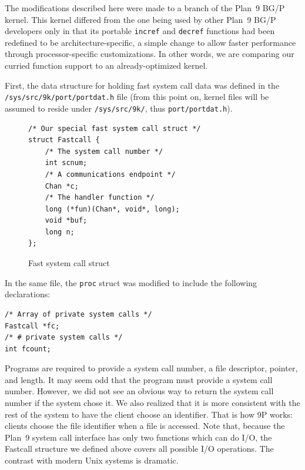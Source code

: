 \documentclass[letterpaper]{article}
\begin{document}
The modifications described here were made to a branch of the Plan~9 BG/P kernel. This kernel differed from the one being used by other Plan~9 BG/P developers only in that its portable {\tt incref} and {\tt decref} functions had been redefined to be architecture-specific, a simple change to allow faster performance through processor-specific customizations. In other words, we are comparing our curried function 
support to an already-optimized kernel. 

First, the data structure for holding fast system call data was defined in the {\tt /sys/src/9k/port/portdat.h} file (from this point on, kernel files will be assumed to reside under {\tt /sys/src/9k/}, thus {\tt port/portdat.h}). 

\begin{figure}
\begin{verbatim}
/* Our special fast system call struct */
struct Fastcall {
    /* The system call number */
    int scnum; 
    /* A communications endpoint */
    Chan *c; 
    /* The handler function */
    long (*fun)(Chan*, void*, long); 
    void *buf;
    long n;
};
\end{verbatim}
\caption{\label{scstruct}Fast system call struct}
\end{figure}

In the same file, the {\tt proc} struct was modified to include the following declarations:

\begin{verbatim}
/* Array of private system calls */
Fastcall *fc;
/* # private system calls */
int fcount; 
\end{verbatim}

Programs are required to provide a system call number, a file descriptor, pointer, and length. It may seem odd that
the program must provide a system call number. However, we did not see an obvious way to return the
system call number if the system
chose it. We also realized that it is more consistent with the rest of the system to have the client choose an identifier. That is how 9P works: clients choose the file identifier when a file is accessed. 
Note that, because the Plan~9 system call interface has only two functions which can do I/O, the 
Fastcall structure we defined above covers all possible I/O operations. The contrast with modern Unix systems is dramatic. 
\end{document}
